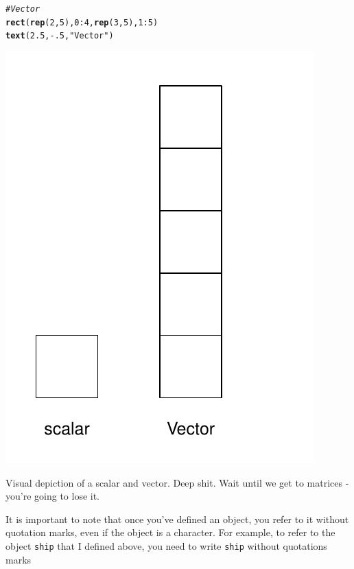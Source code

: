 \documentclass{tufte-book}\usepackage[]{graphicx}\usepackage[]{color}
\makeatletter
\def\maxwidth{ %
  \ifdim\Gin@nat@width>\linewidth
    \linewidth
  \else
    \Gin@nat@width
  \fi
}
\newcommand{\hlnum}[1]{\textcolor[rgb]{0.686,0.059,0.569}{#1}}%
\newcommand{\hlstr}[1]{\textcolor[rgb]{0.192,0.494,0.8}{#1}}%
\newcommand{\hlcom}[1]{\textcolor[rgb]{0.678,0.584,0.686}{\textit{#1}}}%
\newcommand{\hlopt}[1]{\textcolor[rgb]{0,0,0}{#1}}%
\newcommand{\hlstd}[1]{\textcolor[rgb]{0.345,0.345,0.345}{#1}}%
\newcommand{\hlkwd}[1]{\textcolor[rgb]{0.737,0.353,0.396}{\textbf{#1}}}%
\newenvironment{kframe}{%
 \def\at@end@of@kframe{}%
 \ifinner\ifhmode%
  \def\at@end@of@kframe{\end{minipage}}%
  \begin{minipage}{\columnwidth}%
 \fi\fi%
 \def\FrameCommand##1{\hskip\@totalleftmargin \hskip-\fboxsep
 \colorbox{shadecolor}{##1}\hskip-\fboxsep
     \hskip-\linewidth \hskip-\@totalleftmargin \hskip\columnwidth}%
 \MakeFramed {\advance\hsize-\width
   \@totalleftmargin\z@ \linewidth\hsize
   \@setminipage}}%
 {\par\unskip\endMakeFramed%
 \at@end@of@kframe}
\newenvironment{knitrout}{}{} %
\makeatother
\begin{document}
\begin{marginfigure}
\begin{tiny}
\begin{knitrout}
\begin{kframe}
\begin{alltt}
\hlcom{# Vector}
\hlkwd{rect}\hlstd{(}\hlkwd{rep}\hlstd{(}\hlnum{2}\hlstd{,} \hlnum{5}\hlstd{),} \hlnum{0}\hlopt{:}\hlnum{4}\hlstd{,} \hlkwd{rep}\hlstd{(}\hlnum{3}\hlstd{,} \hlnum{5}\hlstd{),} \hlnum{1}\hlopt{:}\hlnum{5}\hlstd{)}
\hlkwd{text}\hlstd{(}\hlnum{2.5}\hlstd{,} \hlopt{-}\hlnum{.5}\hlstd{,} \hlstr{"Vector"}\hlstd{)}
\end{alltt}
\end{kframe}
\includegraphics[width=\maxwidth]{figure/unnamed-chunk-18-1} 

\end{knitrout}
\caption{Visual depiction of a scalar and vector. Deep shit. Wait until we get to matrices - you're going to lose it.}
\label{fig:scalarvector}
\end{tiny}
\end{marginfigure}

It is important to note that once you've defined an object, you refer to it without quotation marks, even if the object is a character. For example, to refer to the object \texttt{ship} that I defined above, you need to write \texttt{ship} without quotations marks
\end{document}
